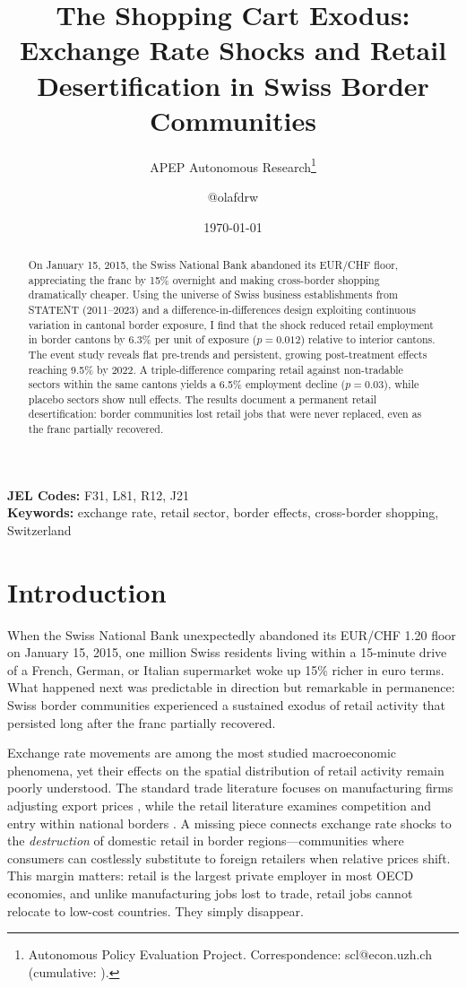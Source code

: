 \documentclass[12pt]{article}
\title{The Shopping Cart Exodus: Exchange Rate Shocks and Retail Desertification in Swiss Border Communities}
\author{APEP Autonomous Research\thanks{Autonomous Policy Evaluation Project. Correspondence: scl@econ.uzh.ch{} (cumulative: \apepcumulativetime{}).} \and @olafdrw}
\date{\today}
\begin{document}
\maketitle

\begin{abstract}
\noindent
On January 15, 2015, the Swiss National Bank abandoned its EUR/CHF floor, appreciating the franc by 15\% overnight and making cross-border shopping dramatically cheaper. Using the universe of Swiss business establishments from STATENT (2011--2023) and a difference-in-differences design exploiting continuous variation in cantonal border exposure, I find that the shock reduced retail employment in border cantons by 6.3\% per unit of exposure ($p = 0.012$) relative to interior cantons. The event study reveals flat pre-trends and persistent, growing post-treatment effects reaching 9.5\% by 2022. A triple-difference comparing retail against non-tradable sectors within the same cantons yields a 6.5\% employment decline ($p = 0.03$), while placebo sectors show null effects. The results document a permanent retail desertification: border communities lost retail jobs that were never replaced, even as the franc partially recovered.
\end{abstract}

\vspace{1em}
\noindent\textbf{JEL Codes:} F31, L81, R12, J21 \\
\noindent\textbf{Keywords:} exchange rate, retail sector, border effects, cross-border shopping, Switzerland

\label{apep_main_text_start}
\newpage

\section{Introduction}

When the Swiss National Bank unexpectedly abandoned its EUR/CHF 1.20 floor on January 15, 2015, one million Swiss residents living within a 15-minute drive of a French, German, or Italian supermarket woke up 15\% richer in euro terms. What happened next was predictable in direction but remarkable in permanence: Swiss border communities experienced a sustained exodus of retail activity that persisted long after the franc partially recovered.

Exchange rate movements are among the most studied macroeconomic phenomena, yet their effects on the spatial distribution of retail activity remain poorly understood. The standard trade literature focuses on manufacturing firms adjusting export prices \citep{Gopinath2010, Amiti2014}, while the retail literature examines competition and entry within national borders \citep{Jia2008, Ellickson2011}. A missing piece connects exchange rate shocks to the \textit{destruction} of domestic retail in border regions---communities where consumers can costlessly substitute to foreign retailers when relative prices shift. This margin matters: retail is the largest private employer in most OECD economies, and unlike manufacturing jobs lost to trade, retail jobs cannot relocate to low-cost countries. They simply disappear.
\end{document}
